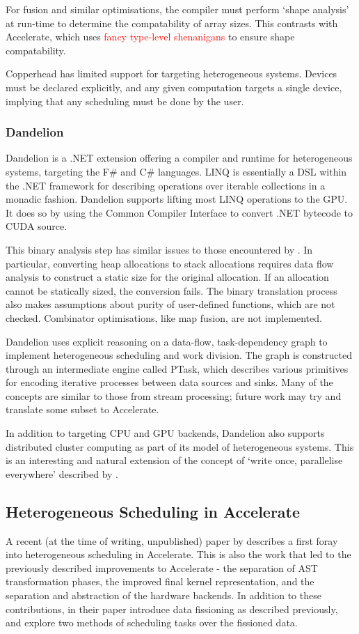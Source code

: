 \documentclass[a4paper,12pt]{article}
\newcommand{\red}[1]{\textcolor{red}{#1}}
\begin{document}
For fusion and similar optimisations, the compiler must perform `shape analysis' at run-time to determine the compatability of array sizes.
This contrasts with Accelerate, which uses \red{fancy type-level shenanigans} to ensure shape compatability.

Copperhead has limited support for targeting heterogeneous systems.
Devices must be declared explicitly, and any given computation targets a single device, implying that any scheduling must be done by the user.

\subsubsection*{Dandelion}
Dandelion is a .NET extension offering a compiler and runtime for heterogeneous systems, targeting the F\# and C\# languages. \citep{rossbach_dandelion:_2013}
LINQ is essentially a DSL within the .NET framework for describing operations over iterable collections in a monadic fashion.
Dandelion supports lifting most LINQ operations to the GPU.
It does so by using the Common Compiler Interface to convert .NET bytecode to CUDA source.

This binary analysis step has similar issues to those encountered by \citet{lee_transparent_2013}.
In particular, converting heap allocations to stack allocations requires data flow analysis to construct a static size for the original allocation.
If an allocation cannot be statically sized, the conversion fails.
The binary translation process also makes assumptions about purity of user-defined functions, which are not checked.
Combinator optimisations, like map fusion, are not implemented.

Dandelion uses explicit reasoning on a data-flow, task-dependency graph to implement heterogeneous scheduling and work division.
The graph is constructed through an intermediate engine called PTask, which describes various primitives for encoding iterative processes between data sources and sinks.
Many of the concepts are similar to those from stream processing; future work may try and translate some subset to Accelerate.

In addition to targeting CPU and GPU backends, Dandelion also supports distributed cluster computing as part of its model of heterogeneous systems.
This is an interesting and natural extension of the concept of `write once, parallelise everywhere' described by \citet{newton_converting_2014}.

\subsection{Heterogeneous Scheduling in Accelerate}
A recent (at the time of writing, unpublished) paper by \citet*{newton_converting_2014} describes a first foray into heterogeneous scheduling in Accelerate.
This is also the work that led to the previously described improvements to Accelerate - the separation of AST transformation phases, the improved final kernel representation, and the separation and abstraction of the hardware backends. 
In addition to these contributions, in their paper  \citeauthor{newton_converting_2014} introduce data fissioning as described previously, and explore two methods of scheduling tasks over the fissioned data.
\end{document}
